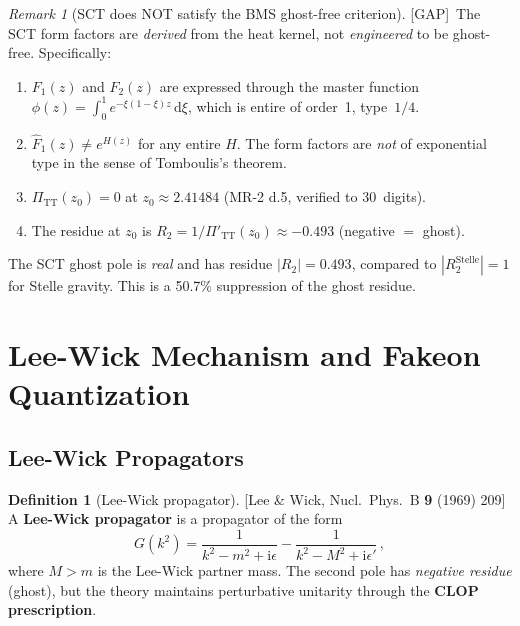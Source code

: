 \documentclass[12pt,a4paper]{article}
\theoremstyle{definition}
\newtheorem{definition}[proposition]{Definition}
\theoremstyle{remark}
\newtheorem{remark}[proposition]{Remark}
\newcommand{\dd}{\mathrm{d}}
\newcommand{\ii}{\mathrm{i}}
\newcommand{\fromlit}[1]{\textcolor{blue!70!black}{\textsf{[#1]}}}
\newcommand{\gap}{\textcolor{red!80!black}{\textsf{[GAP]}}}
\begin{document}
\begin{remark}[SCT does NOT satisfy the BMS ghost-free criterion]
\label{rem:sct-not-ghost-free}
\gap\
The SCT form factors are \emph{derived} from the heat kernel, not
\emph{engineered} to be ghost-free.  Specifically:
\begin{enumerate}[nosep]
  \item $F_1(z)$ and $F_2(z)$ are expressed through the master
    function $\phi(z) = \int_0^1 e^{-\xi(1-\xi)z}\,\dd\xi$,
    which is entire of order~1, type~$1/4$.
  \item $\hat{F}_1(z) \neq e^{H(z)}$ for any entire $H$.  The form
    factors are \emph{not} of exponential type in the sense of
    Tomboulis's theorem.
  \item $\Pi_{\mathrm{TT}}(z_0) = 0$ at $z_0 \approx 2.41484$
    (MR-2 d.5, verified to 30~digits).
  \item The residue at $z_0$ is
    $R_2 = 1/\Pi'_{\mathrm{TT}}(z_0) \approx -0.493$ (negative
    $=$ ghost).
\end{enumerate}
The SCT ghost pole is \emph{real} and has residue $|R_2| = 0.493$,
compared to $|R_2^{\mathrm{Stelle}}| = 1$ for Stelle gravity.  This
is a 50.7\% suppression of the ghost residue.
\end{remark}


\section{Lee-Wick Mechanism and Fakeon Quantization}
\label{sec:lee-wick}

\subsection{Lee-Wick Propagators}

\begin{definition}[Lee-Wick propagator]
\label{def:lw-prop}
\fromlit{Lee \& Wick, Nucl.\ Phys.\ B \textbf{9} (1969) 209}
A \textbf{Lee-Wick propagator} is a propagator of the form
\begin{equation}\label{eq:lw-prop}
  G(k^2) = \frac{1}{k^2 - m^2 + \ii\epsilon}
    - \frac{1}{k^2 - M^2 + \ii\epsilon'}\,,
\end{equation}
where $M > m$ is the Lee-Wick partner mass.  The second pole has
\emph{negative residue} (ghost), but the theory maintains perturbative
unitarity through the \textbf{CLOP prescription}.
\end{definition}
\end{document}
